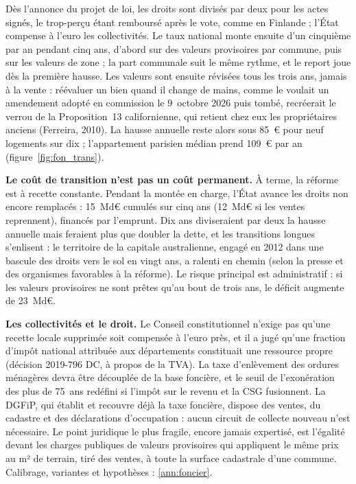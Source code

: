 Dès l'annonce du projet de loi, les droits sont divisés par deux pour les actes signés, le
trop-perçu étant remboursé après le vote, comme en Finlande ; l'État compense à l'euro les collectivités. Le taux national
monte ensuite d'un cinquième par an pendant cinq ans, d'abord sur des valeurs provisoires par commune, puis sur les valeurs de zone ; la part communale
suit le même rythme, et le report joue dès la première hausse. Les valeurs sont ensuite révisées tous les trois ans,
jamais à la vente : réévaluer un bien quand il change de mains, comme le voulait un amendement adopté en commission le
9~octobre 2026 puis tombé, recréerait le verrou de la Proposition~13 californienne, qui retient chez eux les
propriétaires anciens (Ferreira, 2010). La hausse annuelle reste
alors sous 85~€ pour neuf logements sur dix ; l'appartement parisien médian prend 109~€ par an
(figure~\ref{fig:fon_trans}).


\textbf{Le coût de transition n'est pas un coût permanent.} À terme, la réforme est à recette constante. Pendant la
montée en charge, l'État avance les droits non encore remplacés : 15~Md€ cumulés sur cinq ans (12~Md€ si les ventes
reprennent), financés par l'emprunt. Dix ans diviseraient par deux la hausse annuelle mais feraient plus que doubler la
dette, et les transitions longues s'enlisent : le territoire de la capitale australienne, engagé en 2012 dans une bascule
des droits vers le sol en vingt ans, a ralenti en chemin (selon la presse et des organismes favorables à la réforme). Le risque principal est administratif : si les valeurs provisoires ne sont prêtes
qu'au bout de trois ans, le déficit augmente de 23~Md€.

\textbf{Les collectivités et le droit.} Le Conseil constitutionnel
n'exige pas qu'une recette locale supprimée soit compensée à l'euro près, et il a jugé qu'une fraction d'impôt national
attribuée aux départements constituait une ressource propre (décision 2019-796 DC, à propos de la TVA). La taxe
d'enlèvement des ordures ménagères devra être découplée de la base foncière, et le seuil de l'exonération des plus de
75~ans redéfini si l'impôt sur le revenu et la CSG fusionnent. La DGFiP, qui établit et recouvre déjà la taxe foncière,
dispose des ventes, du cadastre et des déclarations d'occupation : aucun circuit de collecte nouveau n'est nécessaire.
Le point juridique le plus fragile, encore jamais expertisé, est l'égalité devant les charges publiques de valeurs
provisoires qui appliquent le même prix au m² de terrain, tiré des ventes, à toute la surface cadastrale d'une commune. Calibrage, variantes et hypothèses : \ref{ann:foncier}.
